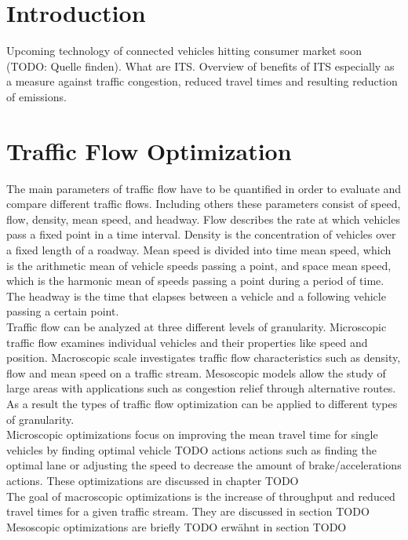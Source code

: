 \documentclass{sig-alternate}
\begin{document}
\date{22 November 2014}

\maketitle
\begin{abstract}

\end{abstract}

\keywords{}

\section{Introduction}
Upcoming technology of connected vehicles hitting consumer market soon (TODO: Quelle finden). What are ITS. Overview of benefits of ITS especially as a measure against traffic congestion, reduced travel times and resulting reduction of emissions.
\section{Traffic Flow Optimization }
The main parameters of traffic flow have to be quantified in order to evaluate and compare different traffic flows. Including others these parameters consist of speed, flow, density, mean speed, and headway. Flow describes the rate at which vehicles pass a fixed point in a time interval. Density is the concentration of vehicles over a fixed length of a roadway. Mean speed is divided into time mean speed, which is the arithmetic mean of vehicle speeds passing a point, and space mean speed, which is the harmonic mean of speeds passing a point during a period of time. The headway is the time that elapses between a vehicle and a following vehicle passing a certain point. \\
Traffic flow can be analyzed at three different levels of granularity. Microscopic traffic flow examines individual vehicles and their properties like speed and position. Macroscopic scale investigates traffic flow characteristics such as density, flow and mean speed on a traffic stream. Mesoscopic models allow the study of large areas with applications such as congestion relief through alternative routes. \\
As a result the types of traffic flow optimization can be applied to different types of granularity. \\
Microscopic optimizations focus on improving the mean travel time for single vehicles by finding optimal vehicle TODO actions actions such as finding the optimal lane or adjusting the speed to decrease the amount of brake/accelerations actions. These optimizations are discussed in chapter TODO\\
The goal of macroscopic optimizations is the increase of throughput and reduced travel times for a given traffic stream. They are discussed in section TODO \\
Mesoscopic optimizations are briefly TODO erwähnt in section TODO\\
\end{document}
